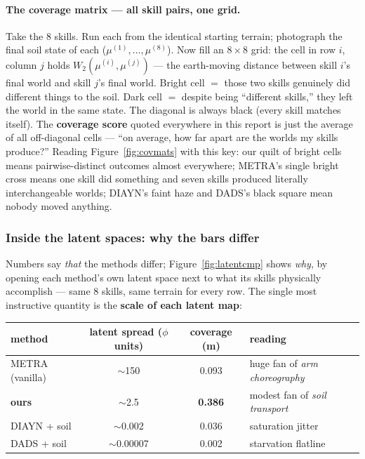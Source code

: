 \documentclass[11pt,a4paper]{article}
\begin{document}
\paragraph{The coverage matrix — all skill pairs, one grid.}
Take the 8 skills. Run each from the identical starting terrain; photograph the
final soil state of each ($\mu^{(1)}, \dots, \mu^{(8)}$). Now fill an
$8\times8$ grid: the cell in row $i$, column $j$ holds
$W_2(\mu^{(i)}, \mu^{(j)})$ --- the earth-moving distance between skill $i$'s
final world and skill $j$'s final world. Bright cell $=$ those two skills
genuinely did different things to the soil. Dark cell $=$ despite being
``different skills,'' they left the world in the same state. The diagonal is
always black (every skill matches itself). The \textbf{coverage score} quoted
everywhere in this report is just the average of all off-diagonal cells ---
``on average, how far apart are the worlds my skills produce?'' Reading
Figure~\ref{fig:covmats} with this key: our quilt of bright cells means
pairwise-distinct outcomes almost everywhere; METRA's single bright cross means
one skill did something and seven skills produced literally interchangeable
worlds; DIAYN's faint haze and DADS's black square mean nobody moved anything.

\subsubsection*{Inside the latent spaces: why the bars differ}

Numbers say \emph{that} the methods differ; Figure~\ref{fig:latentcmp} shows
\emph{why}, by opening each method's own latent space next to what its skills
physically accomplish --- same 8 skills, same terrain for every row. The single
most instructive quantity is the \textbf{scale of each latent map}:

\begin{center}
\small
\begin{tabular}{lccl}
\toprule
method & latent spread ($\phi$ units) & coverage (m) & reading\\
\midrule
METRA (vanilla) & $\sim$150 & 0.093 & huge fan of \emph{arm choreography}\\
\textbf{ours} & $\sim$2.5 & \textbf{0.386} & modest fan of \emph{soil transport}\\
DIAYN + soil & $\sim$0.002 & 0.036 & saturation jitter\\
DADS + soil & $\sim$0.00007 & 0.002 & starvation flatline\\
\bottomrule
\end{tabular}
\end{center}
\end{document}
